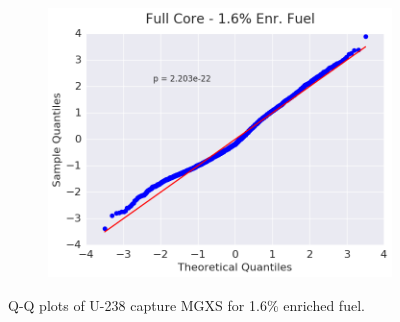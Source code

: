 \begin{figure}[h!]
\begin{subfigure}{0.5\textwidth}
  \centering
  \includegraphics[width=\linewidth]{figures/patterns/full-core/quantile/16-enr-capt-1} \caption{}
  \label{fig:chap9-qq-full-core-1.6-capt}
\end{subfigure}
\caption[Q-Q plots of U-238 capture MGXS for 1.6\% enriched fuel]{Q-Q plots of U-238 capture \ac{MGXS} for 1.6\% enriched fuel.}
\label{fig:chap9-qq-1.6-capt}
\end{figure}

